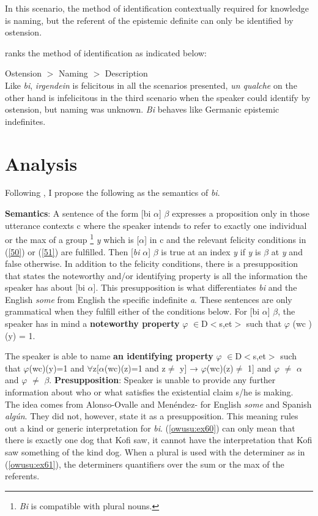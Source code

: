 \documentclass[output=paper,modfonts,nonflat,draftmode]{langsci/langscibook}
\begin{document}
 \z In this scenario, the method of identification contextually required for knowledge is naming, but the referent of the epistemic definite can only be identified by ostension.
 
 \citet{Aloni2001} ranks the method of identification as indicated below:
 
 Ostension $>$ Naming $>$ Description\\
 
Like \emph{bi}, \emph{irgendein} is felicitous in all the scenarios presented, \emph{un qualche} on the other hand is infelicitous in the third scenario when the speaker could identify by ostension, but naming was unknown. \emph{Bi} behaves like Germanic epistemic indefinites.

\section{Analysis}
Following \citet{Ionin2013}, I propose the following as the semantics of \emph{bi}.

\textbf{Semantics}: A sentence of the form [bi $\alpha$] $\beta$ expresses a proposition only in those utterance contexts c where the speaker intends to refer to exactly one individual or the max of a group \footnote{\emph{Bi} is compatible with plural nouns.} \emph{y} which is [$\alpha$] in c and the relevant felicity conditions in (\ref{50}) or (\ref{51}) are fulfilled. Then [\emph{bi} $\alpha$] $\beta$ is true at an index \emph{y} if \emph{y} is $\beta$ at \emph{y} and false otherwise. In addition to the felicity conditions, there is a presupposition that states the noteworthy and/or identifying property is all the information the speaker has about [bi $\alpha$]. This presupposition is what differentiates \emph{bi} and the English \emph{some} from English the specific indefinite \emph{a}.   
These sentences are only grammatical when they fulfill either of the conditions below. 
\ea
\ea \label{50} For [bi $\alpha$] $\beta$, the speaker has in mind a \textbf{noteworthy property} $\varphi$ $\in$D$<$s,et$>$ such that $\varphi$ (wc )(y) = 1.

\ex \label{51} The speaker is able to name \textbf{an identifying property} $\varphi$ $\in$D$<$s,et$>$ such that $\varphi$(wc)(y)=1 and $\forall$z[$\alpha$(wc)(z)=1 and z$\neq$ y] → $\varphi$(wc)(z)$\neq$ 1] and $\varphi$ $\neq$ $\alpha$ and $\varphi$ $\neq$ $\beta$.
\ex \textbf{Presupposition}: Speaker is unable to provide any further information about who or what satisfies the existential claim s/he is making.\\ The idea comes from Alonso-Ovalle and Menéndez-\citet{Benito2003} for English \emph{some} and Spanish \emph{alg\'un}. They did not, however, state it as a presupposition.  
\z \z This meaning rules out a kind or generic interpretation for \emph{bi}. (\ref{owusu:ex60}) can only mean that there is exactly one dog that Kofi saw, it cannot have the interpretation that Kofi saw something of the kind dog. When a plural is used with the determiner as in (\ref{owusu:ex61}), the determiners quantifiers over the sum or the max of the referents.
\end{document}
